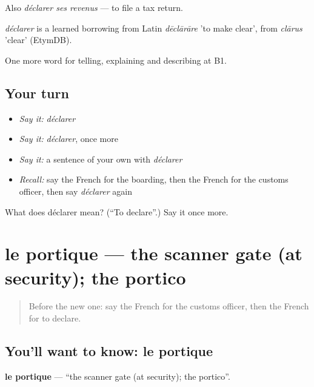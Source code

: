 Also \emph{déclarer ses revenus} — to file a tax return.

\begin{cousinweb}
\emph{déclarer} is a learned borrowing from Latin \emph{dēclārāre} 'to make clear', from \emph{clārus} 'clear' (EtymDB).
\end{cousinweb}

\begin{grammarlens}[title={What you've built}]
One more word for telling, explaining and describing at B1.
\end{grammarlens}

\subsection*{Your turn}
\begin{itemize}
\raggedright
  \item \emph{Say it:} \emph{déclarer}
  \item \emph{Say it:} \emph{déclarer}, once more
  \item \emph{Say it:} a sentence of your own with \emph{déclarer}
  \item \emph{Recall:} say the French for the boarding, then the French for the customs officer, then say \emph{déclarer} again
\end{itemize}

\begin{tcolorbox}[breakable,colback=teal!4,colframe=teal!35!black,title={Before you move on}]
What does déclarer mean? (\textquotedblleft{}To declare\textquotedblright{}.) Say it once more.
\end{tcolorbox}
\section[le portique]{le portique — the scanner gate (at security); the portico}

\label{lesson:FR-C417-portique}



\begin{quote}
Before the new one: say the French for the customs officer, then the French for to declare.
\end{quote}

\subsection*{You'll want to know: le portique}
\textbf{le portique} — \textquotedblleft{}the scanner gate (at security); the portico\textquotedblright{}.

